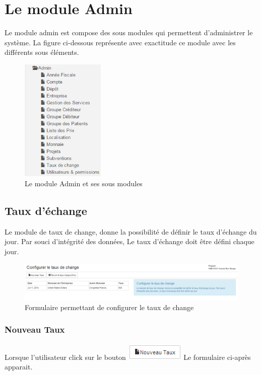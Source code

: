 \documentclass[12pt,a4paper]{report}
\begin{document}
\chapter{Le module Admin}        
Le module admin est compose des sous modules qui permettent d'administrer le système. La figure ci-dessous représente avec exactitude ce module avec les différents sous éléments.
\begin{figure}[h]
\begin{center}
\includegraphics[width=4cm]{pic/s_admin.png}
\end{center}
\caption{Le module Admin et ses sous modules}
\label{Le module Admin et ses sous menus}
\end{figure} 

\section{Taux d'échange}
Le module de taux de change, donne la possibilité de définir le taux d'échange du jour. Par souci d'intégrité des données, Le taux d'échange doit être défini chaque jour.


\begin{figure}[h]
\begin{center}
\includegraphics[width=16cm]{pic/FormulaireConfigRate.png}
\end{center}
\caption{Formulaire permettant de configurer le taux de change}
\label{Formulaire permettant de configurer le taux de change}
\end{figure}

\subsection{Nouveau Taux}
Lorsque l'utilisateur click sur le bouton \includegraphics[scale=0.7]{pic/NouveauTaux.png}
 Le formulaire ci-après apparait.
\end{document}

